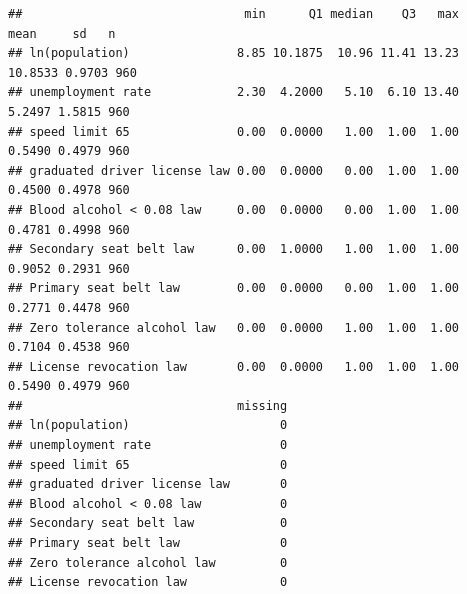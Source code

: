 \documentclass[
]{article}
\newenvironment{Shaded}{\begin{snugshade}}{\end{snugshade}}
\newcommand{\DecValTok}[1]{\textcolor[rgb]{0.00,0.00,0.81}{#1}}
\newcommand{\FunctionTok}[1]{\textcolor[rgb]{0.00,0.00,0.00}{#1}}
\newcommand{\NormalTok}[1]{#1}
\newcommand{\OtherTok}[1]{\textcolor[rgb]{0.56,0.35,0.01}{#1}}
\newcommand{\SpecialCharTok}[1]{\textcolor[rgb]{0.00,0.00,0.00}{#1}}
\newcommand{\StringTok}[1]{\textcolor[rgb]{0.31,0.60,0.02}{#1}}
\begin{document}
\begin{Shaded}
\end{Shaded}

\begin{verbatim}
##                               min      Q1 median    Q3   max    mean     sd   n
## ln(population)               8.85 10.1875  10.96 11.41 13.23 10.8533 0.9703 960
## unemployment rate            2.30  4.2000   5.10  6.10 13.40  5.2497 1.5815 960
## speed limit 65               0.00  0.0000   1.00  1.00  1.00  0.5490 0.4979 960
## graduated driver license law 0.00  0.0000   0.00  1.00  1.00  0.4500 0.4978 960
## Blood alcohol < 0.08 law     0.00  0.0000   0.00  1.00  1.00  0.4781 0.4998 960
## Secondary seat belt law      0.00  1.0000   1.00  1.00  1.00  0.9052 0.2931 960
## Primary seat belt law        0.00  0.0000   0.00  1.00  1.00  0.2771 0.4478 960
## Zero tolerance alcohol law   0.00  0.0000   1.00  1.00  1.00  0.7104 0.4538 960
## License revocation law       0.00  0.0000   1.00  1.00  1.00  0.5490 0.4979 960
##                              missing
## ln(population)                     0
## unemployment rate                  0
## speed limit 65                     0
## graduated driver license law       0
## Blood alcohol < 0.08 law           0
## Secondary seat belt law            0
## Primary seat belt law              0
## Zero tolerance alcohol law         0
## License revocation law             0
\end{verbatim}
\end{document}
